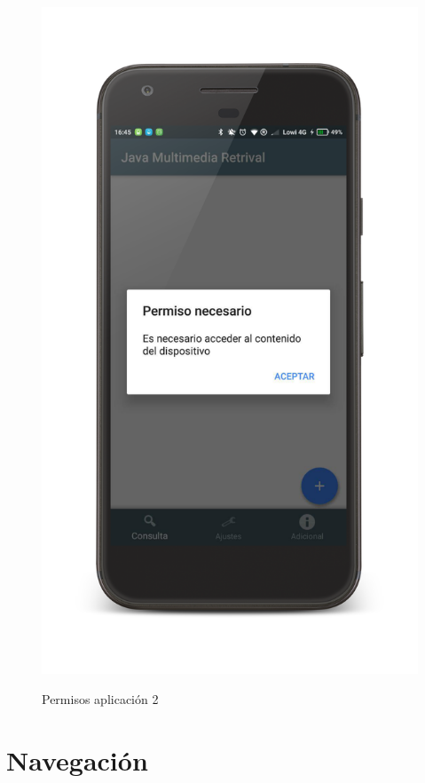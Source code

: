 \begin{figure}[H] %
\centering
\includegraphics[scale=0.15]{imagenes/permisos2.png}  %
\label{permisos2.png}
\caption{Permisos aplicación 2}
\end{figure}

\section{Navegación}

